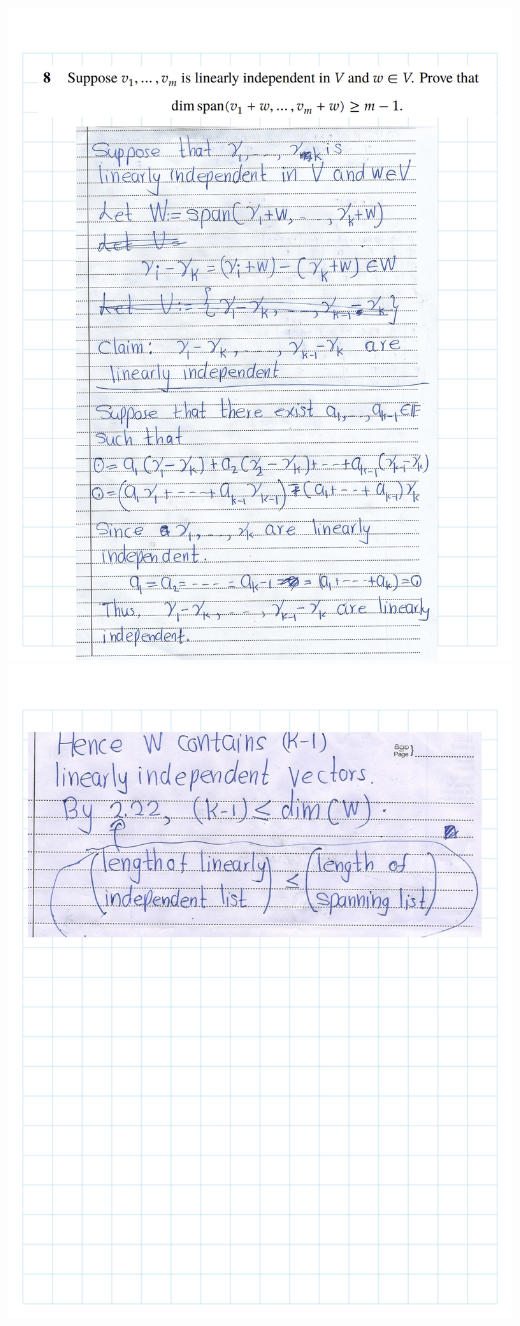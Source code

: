 \documentclass[
]{book}
\theoremstyle{definition}
\theoremstyle{definition}
\theoremstyle{definition}
\theoremstyle{definition}
\theoremstyle{remark}
\begin{document}
\includegraphics{fig/Ex 2B and 2C/Ex 2c (36).png}
\includegraphics{fig/Ex 2B and 2C/Ex 2c (37).png}
\end{document}

